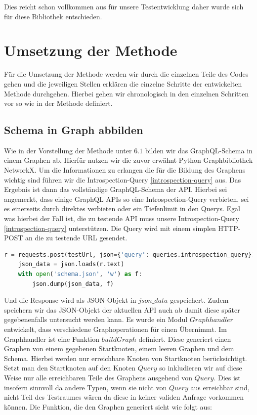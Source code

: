 Dies reicht schon vollkommen aus für unsere Testentwicklung daher wurde sich für diese Bibliothek entschieden.

\section{Umsetzung der Methode}

Für die Umsetzung der Methode werden wir durch die einzelnen Teile des Codes gehen und die jeweiligen Stellen erklären die
einzelne Schritte der entwickelten Methode durchgehen.
Hierbei gehen wir chronologisch in den einzelnen Schritten vor so wie in der Methode definiert.

\subsection{Schema in Graph abbilden}

Wie in der Vorstellung der Methode unter $6.1$ bilden wir das GraphQL-Schema in einem Graphen ab.
Hierfür nutzen wir die zuvor erwähnt Python Graphbibliothek NetworkX.
Um die Informationen zu erlangen die für die Bildung des Graphens wichtig sind führen wir die Introspection-Query \ref{introspection-query}
aus.
Das Ergebnis ist dann das vollständige GraphQL-Schema der API.
Hierbei sei angemerkt, dass einige GraphQL APIs so eine Introspection-Query verbieten, sei es einerseits durch direktes verbieten oder ein Tiefenlimit in den Querys.
Egal was hierbei der Fall ist, die zu testende API muss unsere Introspection-Query \ref{introspection-query} unterstützen.
Die Query wird mit einem simplen HTTP-POST an die zu testende URL gesendet.

\begin{lstlisting}[language=Python]
    r = requests.post(testUrl, json={'query': queries.introspection_query})
    json_data = json.loads(r.text)
    with open('schema.json', 'w') as f:
        json.dump(json_data, f)
\end{lstlisting}

Und die Response wird als JSON-Objekt in $json\_data$ gespeichert.
Zudem speichern wir das JSON-Objekt der aktuellen API auch ab damit diese später gegebenenfalls untersucht werden kann.
Es wurde ein Modul $Graphhandler$ entwickelt, dass verschiedene Graphoperationen für einen Übernimmt.
Im Graphhandler ist eine Funktion $buildGraph$ definiert.
Diese generiert einen Graphen von einem gegebenen Startknoten, einem leeren Graphen und dem Schema.
Hierbei werden nur erreichbare Knoten von Startknoten berücksichtigt.
Setzt man den Startknoten auf den Knoten $Query$ so inkludieren wir auf diese Weise nur alle erreichbaren Teile
des Graphens ausgehend von $Query$.
Dies ist insofern sinnvoll da andere Typen, wenn sie nicht von $Query$ aus erreichbar sind, nicht Teil des Testraumes wären da diese
in keiner validen Anfrage vorkommen können.
Die Funktion, die den Graphen generiert sieht wie folgt aus:

